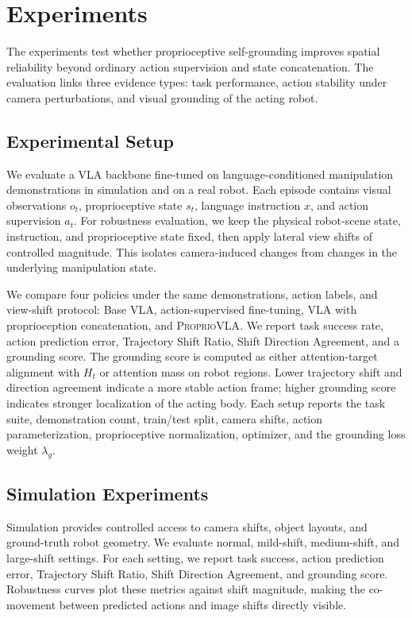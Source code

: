 \section{Experiments}

The experiments test whether proprioceptive self-grounding improves spatial
reliability beyond ordinary action supervision and state concatenation. The
evaluation links three evidence types: task performance, action stability under
camera perturbations, and visual grounding of the acting robot.

\subsection{Experimental Setup}

We evaluate a VLA backbone fine-tuned on language-conditioned manipulation
demonstrations in simulation and on a real robot. Each episode contains visual
observations \(o_t\), proprioceptive state \(s_t\), language instruction \(x\),
and action supervision \(a_t\). For robustness evaluation, we keep the physical
robot-scene state, instruction, and proprioceptive state fixed, then apply
lateral view shifts of controlled magnitude. This isolates camera-induced
changes from changes in the underlying manipulation state.

We compare four policies under the same demonstrations, action labels, and
view-shift protocol: Base VLA, action-supervised fine-tuning, VLA with
proprioception concatenation, and \textsc{ProprioVLA}. We report task success
rate, action prediction error, Trajectory Shift Ratio, Shift Direction
Agreement, and a grounding score. The grounding score is computed as either
attention-target alignment with \(H_t\) or attention mass on robot regions.
Lower trajectory shift and direction agreement indicate a more stable action
frame; higher grounding score indicates stronger localization of the acting
body. Each setup reports the task suite, demonstration count, train/test split,
camera shifts, action parameterization, proprioceptive normalization,
optimizer, and the grounding loss weight \(\lambda_g\).

\subsection{Simulation Experiments}

Simulation provides controlled access to camera shifts, object layouts, and
ground-truth robot geometry. We evaluate normal, mild-shift, medium-shift, and
large-shift settings. For each setting, we report task success, action
prediction error, Trajectory Shift Ratio, Shift Direction Agreement, and
grounding score. Robustness curves plot these metrics against shift magnitude,
making the co-movement between predicted actions and image shifts directly
visible.

